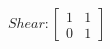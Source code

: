 \documentclass[preview]{standalone}
\begin{document}
\begin{align*}
Shear: \begin{bmatrix} 1 & 1 \\ 0 & 1 \end{bmatrix}
\end{align*}
\end{document}
